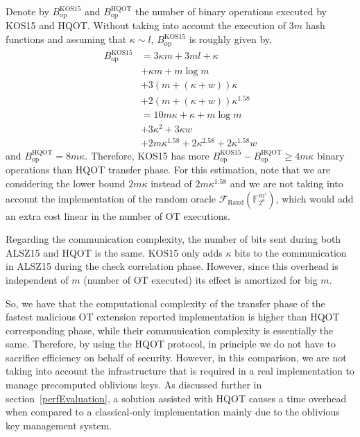 Denote by $B_{\text{op}}^\text{KOS15}$ and $B_{\text{op}}^\text{HQOT}$ the number of binary operations executed by KOS15 and HQOT. Without taking into account the execution of $3 m$ hash functions and assuming that $\kappa \sim l$, $B_{\text{op}}^\text{KOS15}$ is roughly given by,
\begin{equation*}
\begin{split}
    B_{\text{op}}^\text{KOS15} &= 3\kappa m + 3ml + \kappa \\
    &+ \kappa m + m \log m \\
    &+ 3(m + (\kappa + w))\kappa \\
    &+ 2(m + (\kappa + w))\kappa^{1.58}\\
    &= 10 m \kappa + \kappa + m\log m \\
    &+ 3\kappa^2 + 3\kappa w \\
    &+ 2 m \kappa^{1.58} + 2 \kappa^{2.58} + 2\kappa^{1.58}w
\end{split}
\end{equation*}
and $B_{\text{op}}^\text{HQOT} = 8 m \kappa$. Therefore, KOS15 has more $B_{\text{op}}^\text{KOS15} - B_{\text{op}}^\text{HQOT}  \geq 4 m\kappa$ binary operations than HQOT transfer phase. 
For this estimation, note that we are considering the lower bound $2 m \kappa$ instead of $2 m \kappa^{1.58}$ and we are not taking into account the implementation of the random oracle $\mathcal{F}_{\text{Rand}}(\mathbb{F}^{m'}_{2^\kappa})$, which would add an extra cost linear in the number of OT executions.

Regarding the communication complexity, the number of bits sent during both ALSZ15 and HQOT is the same. KOS15 only adds $\kappa$ bits to the communication in ALSZ15 during the check correlation phase. However, since this overhead is independent of $m$ (number of OT executed) its effect is amortized for big $m$.

So, we have that the computational complexity of the transfer phase of the fastest malicious OT extension reported implementation \cite{K15} is higher than HQOT corresponding phase, while their communication complexity is essentially the same. Therefore, by using the HQOT protocol, in principle we do not have to sacrifice efficiency on behalf of security. However, in this comparison, we are not taking into account the infrastructure that is required in a real implementation to manage precomputed oblivious keys. As discussed further in section~\ref{perfEvaluation}, a solution assisted with HQOT causes a time overhead when compared to a classical-only implementation mainly due to the oblivious key management system.

